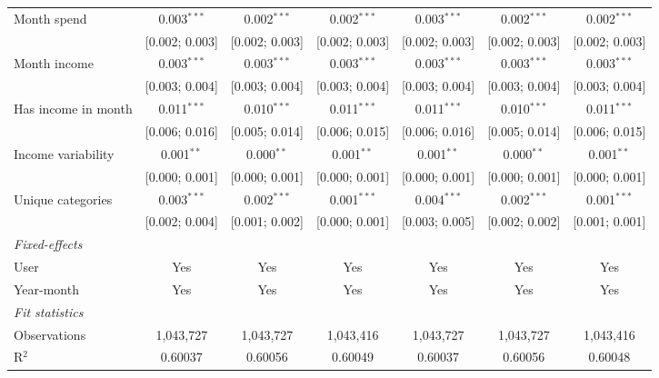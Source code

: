 \begin{table}[htbp]
\begin{threeparttable}[b]
\begin{tabular}{lcccccc}
         Month spend                & 0.003$^{***}$  & 0.002$^{***}$   & 0.002$^{***}$   & 0.003$^{***}$   & 0.002$^{***}$   & 0.002$^{***}$\\   
                                    & [0.002; 0.003] & [0.002; 0.003]  & [0.002; 0.003]  & [0.002; 0.003]  & [0.002; 0.003]  & [0.002; 0.003]\\   
         Month income               & 0.003$^{***}$  & 0.003$^{***}$   & 0.003$^{***}$   & 0.003$^{***}$   & 0.003$^{***}$   & 0.003$^{***}$\\   
                                    & [0.003; 0.004] & [0.003; 0.004]  & [0.003; 0.004]  & [0.003; 0.004]  & [0.003; 0.004]  & [0.003; 0.004]\\   
         Has income in month        & 0.011$^{***}$  & 0.010$^{***}$   & 0.011$^{***}$   & 0.011$^{***}$   & 0.010$^{***}$   & 0.011$^{***}$\\   
                                    & [0.006; 0.016] & [0.005; 0.014]  & [0.006; 0.015]  & [0.006; 0.016]  & [0.005; 0.014]  & [0.006; 0.015]\\   
         Income variability         & 0.001$^{**}$   & 0.000$^{**}$    & 0.001$^{**}$    & 0.001$^{**}$    & 0.000$^{**}$    & 0.001$^{**}$\\   
                                    & [0.000; 0.001] & [0.000; 0.001]  & [0.000; 0.001]  & [0.000; 0.001]  & [0.000; 0.001]  & [0.000; 0.001]\\   
         Unique categories          & 0.003$^{***}$  & 0.002$^{***}$   & 0.001$^{***}$   & 0.004$^{***}$   & 0.002$^{***}$   & 0.001$^{***}$\\   
                                    & [0.002; 0.004] & [0.001; 0.002]  & [0.000; 0.001]  & [0.003; 0.005]  & [0.002; 0.002]  & [0.001; 0.001]\\   
         \midrule
         \emph{Fixed-effects}\\
         User                       & Yes            & Yes             & Yes             & Yes             & Yes             & Yes\\  
         Year-month                 & Yes            & Yes             & Yes             & Yes             & Yes             & Yes\\  
         \midrule
         \emph{Fit statistics}\\
         Observations               & 1,043,727      & 1,043,727       & 1,043,416       & 1,043,727       & 1,043,727       & 1,043,416\\  
         R$^2$                      & 0.60037        & 0.60056         & 0.60049         & 0.60037         & 0.60056         & 0.60048\\  

\end{tabular}
\end{threeparttable}
\end{table}
